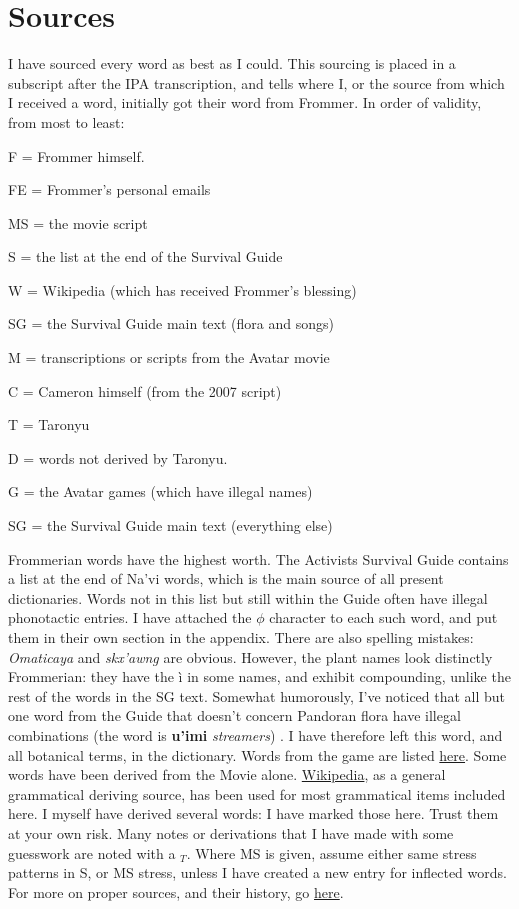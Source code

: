 \documentclass[11pt]{article}
\newenvironment{packed_enum}{
\begin{itemize}
  \setlength{\itemsep}{1pt}
  \setlength{\parskip}{0pt}
  \setlength{\parsep}{0pt}
}{\end{itemize}}
\begin{document}
\section*{Sources}
I have sourced every word as best as I could. This sourcing is placed in a subscript after the IPA transcription, and tells where I, or the source from which I received a word, initially got their word from Frommer. In order of validity, from most to least:\begin{packed_enum}
\item F = Frommer himself.
\item FE = Frommer's personal emails
\item MS = the movie script
\item S = the list at the end of the Survival Guide
\item W = Wikipedia (which has received Frommer's blessing)
\item SG = the Survival Guide main text (flora and songs)
\item M = transcriptions or scripts from the Avatar movie
\item C = Cameron himself (from the 2007 script)
\item T = Taronyu
\item D  = words not derived by Taronyu.
\item G = the Avatar games (which have illegal names)
\item SG = the Survival Guide main text (everything else)
\end{packed_enum}
Frommerian words have the highest worth. The Activists Survival Guide contains a list at the end of Na'vi words, which is the main source of all present dictionaries. Words not in this list but still within the Guide often have illegal phonotactic entries. I have attached the $\phi$ character to each such word, and put them in their own section in the appendix. There are also spelling mistakes: {\it Omaticaya} and {\it skx'awng} are obvious. However, the plant names look distinctly Frommerian: they have the \`i in some names, and exhibit compounding, unlike the rest of the words in the SG text. Somewhat humorously, I've noticed that all but one word from the Guide that doesn't concern Pandoran flora have illegal combinations (the word is {\bf u'imi} {\it streamers}) . I have therefore left this word, and all botanical terms, in the dictionary.
Words from the game are listed \href{http://forum.learnnavi.org/index.php?topic=412.0}{here}. Some words have been derived from the Movie alone. \href{http://en.wikipedia.org/wiki/Na\%27vi_language}{Wikipedia}, as a general grammatical deriving source, has been used for most grammatical items included here. I myself have derived several words: I have marked those here. Trust them at your own risk. Many notes or derivations that I have made with some guesswork are noted with a $_T$. Where MS is given, assume either same stress patterns in S, or MS stress, unless I have created a new entry for inflected words. For more on proper sources, and their history, go \href{http://forum.learnnavi.org/index.php?topic=727.0}{here}.\\
\end{document}

